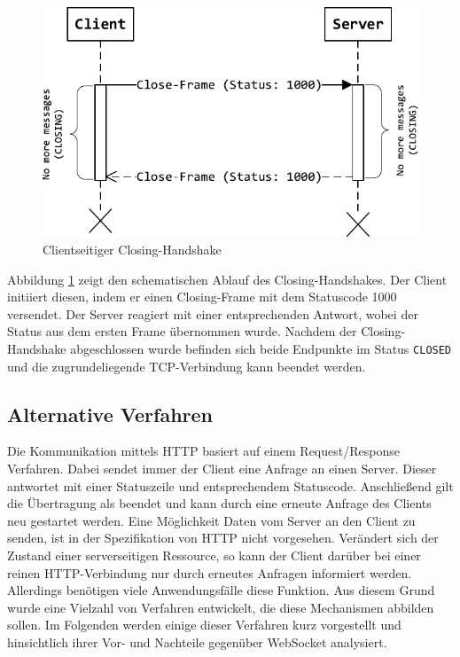 \documentclass[11pt,a4paper,titlepage]{scrartcl}
\numberwithin{equation}{section}
\begin{document}
\begin{figure}[ht] 
	\begin{center}
		\includegraphics[scale=1]{img/closehandshake.pdf}
		\caption{Clientseitiger Closing-Handshake}
		\label{fig:wsClosingHandshake}
	\end{center}
\end{figure}

\noindent Abbildung \ref{fig:wsClosingHandshake} zeigt den schematischen Ablauf des Closing-Handshakes. Der Client initiiert diesen, indem er einen Closing-Frame mit dem Statuscode 1000 versendet. Der Server reagiert mit einer entsprechenden Antwort, wobei der Status aus dem ersten Frame übernommen wurde. Nachdem der Closing-Handshake abgeschlossen wurde befinden sich beide Endpunkte im Status \texttt{CLOSED} und die zugrundeliegende TCP-Verbindung kann beendet werden.

\subsection{Alternative Verfahren}\label{subsubsec:AlternativeVerfahren}
Die Kommunikation mittels HTTP basiert auf einem Request/Response Verfahren. Dabei sendet immer der Client eine Anfrage an einen Server. Dieser antwortet mit einer Statuszeile und entsprechendem Statuscode. Anschließend gilt die Übertragung als beendet und kann durch eine erneute Anfrage des Clients neu gestartet werden. Eine Möglichkeit Daten vom Server an den Client zu senden, ist in der Spezifikation von HTTP nicht vorgesehen. Verändert sich der Zustand einer serverseitigen Ressource, so kann der Client darüber bei einer reinen HTTP-Verbindung nur durch erneutes Anfragen informiert werden. Allerdings benötigen viele Anwendungsfälle diese Funktion. Aus diesem Grund wurde eine Vielzahl von Verfahren entwickelt, die diese Mechanismen abbilden sollen. Im Folgenden werden einige dieser Verfahren kurz vorgestellt und hinsichtlich ihrer Vor- und Nachteile gegenüber WebSocket analysiert.\\
\end{document}
